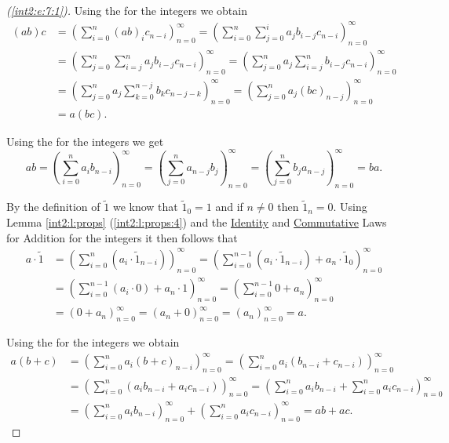 \begin{proof}[(\ref{int2:e:7:1})]
	Using the  for the integers we obtain
	\begin{align*}
		(a b) c & = \left( \sum_{i=0}^{n}(a b)_{i} c_{n-i} \right)_{n=0}^\infty = \left( \sum_{i=0}^{n} \sum_{j=0}^{i} a_{j} b_{i-j} c_{n-i}  \right)_{n=0}^\infty                    \\
		        & = \left( \sum_{j=0}^{n} \sum_{i=j}^{n} a_{j} b_{i-j} c_{n-i} \right)_{n=0}^\infty = \left( \sum_{j=0}^{n} a_{j} \sum_{i=j}^{n} b_{i-j} c_{n-i} \right)_{n=0}^\infty \\
		        & = \left( \sum_{j=0}^{n} a_{j} \sum_{k=0}^{n-j} b_{k} c_{n-j-k} \right)_{n=0}^\infty = \left( \sum_{j=0}^{n} a_{j}(b c)_{n-j} \right)_{n=0}^\infty                   \\
		        & = a(b c).
	\end{align*}

	Using the  for the integers we get
	\[
		a b = \left( \sum_{i=0}^n a_{i} b_{n-i} \right)_{n=0}^\infty = \left( \sum_{j=0}^n a_{n-j} b_{j} \right)_{n=0}^\infty = \left( \sum_{j=0}^n b_{j} a_{n-j} \right)_{n=0}^\infty = b a.
	\]


	By the definition of $\widetilde{1}$ we know that $\widetilde{1}_0 = 1$ and if $n \not= 0$ then $\widetilde{1}_n = 0$. Using Lemma \ref{int2:l:props} (\ref{int2:l:props:4}) and the \hyperref[int2:d:oid:identity_add]{Identity} and \hyperref[int2:d:oid:commutative_add]{Commutative} Laws for Addition for the integers it then follows that
	\begin{align*}
		a \cdot \widetilde{1} & = \left( \sum_{i=0}^n (a_i \cdot \widetilde{1}_{n-i}) \right)_{n=0}^\infty
		= \left( \sum_{i=0}^{n-1} (a_i \cdot \widetilde{1}_{n-i}) + a_n \cdot \widetilde{1}_0 \right)_{n=0}^\infty \\
		\
		                      & = \left( \sum_{i=0}^{n-1} (a_i \cdot 0) + a_n \cdot 1 \right)_{n=0}^\infty
		= \left( \sum_{i=0}^{n-1} 0 + a_n \right)_{n=0}^\infty                                                     \\
		\
		                      & = (0 + a_n)_{n=0}^\infty = (a_n + 0)_{n=0}^\infty = (a_n)_{n=0}^\infty = a.
	\end{align*}

	Using the  for the integers we obtain
	\begin{align*}
		a(b + c) & = \left( \sum_{i=0}^n a_i(b + c)_{n-i} \right)_{n=0}^\infty = \left( \sum_{i=0}^n a_i(b_{n-i} + c_{n-i}) \right)_{n=0}^\infty                            \\
		         & = \left( \sum_{i=0}^n (a_i b_{n-i} + a_i c_{n-i}) \right)_{n=0}^\infty = \left( \sum_{i=0}^n a_i b_{n-i} + \sum_{i=0}^n a_i c_{n-i} \right)_{n=0}^\infty \\
		         & = \left( \sum_{i=0}^n a_i b_{n-i} \right)_{n=0}^\infty + \left( \sum_{i=0}^n a_i c_{n-i} \right)_{n=0}^\infty = a b + a c.
	\end{align*}


\end{proof}
